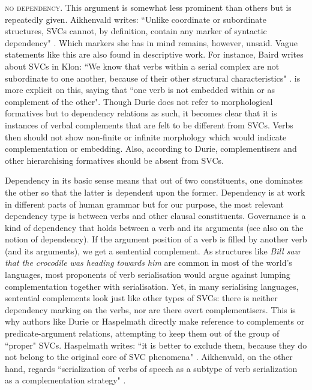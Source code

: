 \textsc{no dependency}. This argument is somewhat less prominent than others but is repeatedly given. Aikhenvald writes: ``Unlike coordinate or subordinate structures, SVCs cannot, by definition, contain any marker of syntactic dependency" \citep[20]{Aikhenvald2006}. Which markers she has in mind remains, however, unsaid. Vague statements like this are also found in descriptive work. For instance, Baird writes about SVCs in Klon: ``We know that verbs within a serial complex are not subordinate to one another, because of their other structural characteristics" \citep[136]{baird2008motion}. \citet[291]{Durie1997} is more explicit on this, saying that ``one verb is not embedded within or as complement of the other". Though Durie does not refer to morphological formatives but to dependency relations as such, it becomes clear that it is instances of verbal complements that are felt to be different from SVCs. Verbs then should not show non-finite or infinite morphology which would indicate complementation or embedding. Also, according to Durie, complementisers and other hierarchising formatives should be absent from SVCs. 

Dependency in its basic sense means that out of two constituents, one dominates the other so that the latter is dependent upon the former. Dependency is at work in different parts of human grammar but for our purpose, the most relevant dependency type is between verbs and other clausal constituents. Governance is a kind of dependency that holds between a verb and its arguments (see also \citealt{bril2007nexus} on the notion of dependency). If the argument position of a verb is filled by another verb (and its arguments), we get a sentential complement. As structures like \textit{Bill saw that the crocodile was heading towards him} are common in most of the world's languages, most proponents of verb serialisation would argue against lumping complementation together with serialisation. Yet, in many serialising languages, sentential complements look just like other types of SVCs: there is neither dependency marking on the verbs, nor are there overt complementisers. This is why authors like Durie or Haspelmath directly make reference to complements or predicate-argument relations, attempting to keep them out of the group of ``proper" SVCs. Haspelmath writes: ``it is better to exclude them, because they do not belong to the original core of SVC phenomena" \citep[15]{haspelmath2016serial}. Aikhenvald, on the other hand, regards ``serialization of verbs of speech as a subtype of verb serialization as a complementation strategy" \citep[25]{Aikhenvald2006}.   

